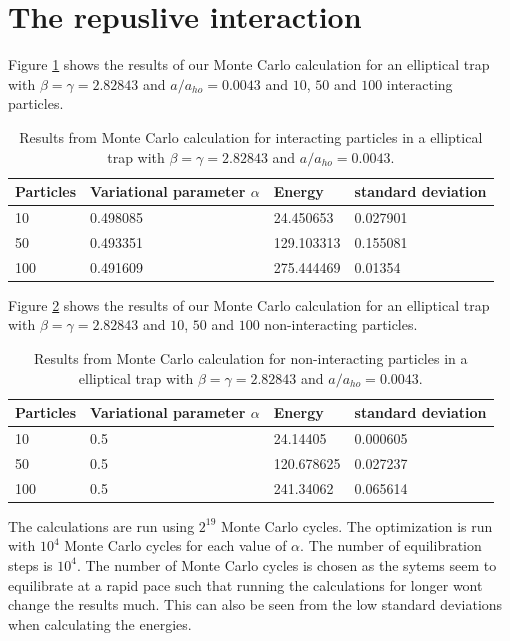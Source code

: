 \documentclass[a4paper, 10pt, english]{revtex4-2} %
\begin{document}
\section{\large The repuslive interaction}
    Figure \ref{results 1} shows the results of our Monte Carlo calculation for an elliptical trap with $\beta = \gamma = 2.82843$ and $a/a_{ho} = 0.0043$ and $10$, $50$ and $100$ interacting particles.
    \begin{table}[!ht]
        \begin{tabular}{|l|l|l|l|}
        \hline
        Particles           & Variational parameter $\alpha$    & Energy         & standard deviation   \\ \hline
        10                  & 0.498085                          & 24.450653      & 0.027901             \\ \hline
        50                  & 0.493351                          & 129.103313     & 0.155081             \\ \hline
        100                 & 0.491609                          & 275.444469     & 0.01354              \\ \hline
        \end{tabular}
        \caption{Results from Monte Carlo calculation for interacting particles in a elliptical trap with $\beta = \gamma = 2.82843$ and $a/a_{ho} = 0.0043$.}
        \label{results 1}
    \end{table}
    Figure \ref{results 2} shows the results of our Monte Carlo calculation for an elliptical trap with $\beta = \gamma = 2.82843$ and $10$, $50$ and $100$ non-interacting particles.
    \begin{table}[!ht]
        \begin{tabular}{|l|l|l|l|}
        \hline
        Particles           & Variational parameter $\alpha$    & Energy         & standard deviation   \\ \hline
        10                  & 0.5                               & 24.14405       & 0.000605             \\ \hline
        50                  & 0.5                               & 120.678625     & 0.027237             \\ \hline
        100                 & 0.5                               & 241.34062      & 0.065614             \\ \hline
        \end{tabular}
        \caption{Results from Monte Carlo calculation for non-interacting particles in a elliptical trap with $\beta = \gamma = 2.82843$ and $a/a_{ho} = 0.0043$.}
        \label{results 2}
    \end{table}
    The calculations are run using $2^{19}$ Monte Carlo cycles.
    The optimization is run with $10^4$ Monte Carlo cycles for each value of $\alpha$.
    The number of equilibration steps is $10^4$.
    The number of Monte Carlo cycles is chosen as the sytems seem to equilibrate at a rapid pace such that running the calculations for longer wont change the results much.
    This can also be seen from the low standard deviations when calculating the energies.
\end{document}
